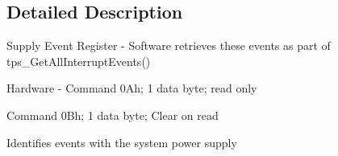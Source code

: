 \subsection{Detailed Description}
Supply Event Register -\/ Software retrieves these events as part of tps\-\_\-\-Get\-All\-Interrupt\-Events() \par
 Hardware -\/ Command 0\-Ah; 1 data byte; read only \par

\begin{DoxyItemize}
\item Command 0\-Bh; 1 data byte; Clear on read \par
\par
 Identifies events with the system power supply 
\end{DoxyItemize}

